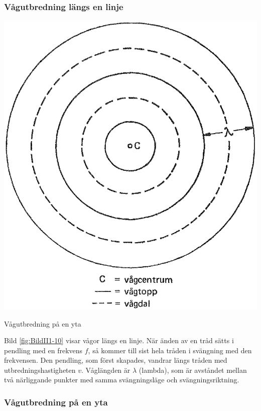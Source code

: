 \subsubsection{Vågutbredning längs en linje}

\begin{marginfigure}
  \includegraphics[width=\textwidth]{images/cropped_pdfs/bild_2_1-11.pdf}
  \caption{Vågutbredning på en yta}
  \label{fig:BildII1-11}
\end{marginfigure}

Bild \ref{fig:BildII1-10} visar vågor längs en linje.
När änden av en tråd sätts i pendling med en frekvens \(f\), så kommer till
sist hela tråden i svängning med den frekvensen.
Den pendling, som först skapades, vandrar längs tråden med
utbredningshastigheten \(v\).
Våglängden är \(\lambda\) (lambda), som är avståndet mellan två närliggande
punkter med samma svängningsläge och svängningsriktning.

\subsubsection{Vågutbredning på en yta}

